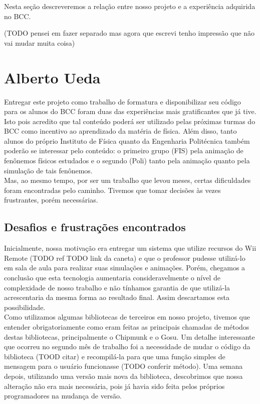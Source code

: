 Nesta seção descreveremos a relação entre nosso projeto e a experiência adquirida no BCC.

(TODO pensei em fazer separado mas agora que escrevi tenho impressão que não vai mudar muita coisa)

\section{Alberto Ueda}
Entregar este projeto como trabalho de formatura e disponibilizar seu código para os alunos do BCC foram duas das experiências mais gratificantes que já tive. Isto pois acredito que tal conteúdo poderá ser utilizado pelas próximas turmas do BCC como incentivo ao aprendizado da matéria de física. Além disso, tanto alunos do próprio Instituto de Física quanto da Engenharia Politécnica também poderão se interessar pelo conteúdo: o primeiro grupo (FIS) pela animação de fenônemos físicos estudados e o segundo (Poli) tanto pela animação quanto pela simulação de tais fenônemos. \\

Mas, ao mesmo tempo, por ser um trabalho que levou meses, certas dificuldades foram encontradas pelo caminho. Tivemos que tomar decisões às vezes frustrantes, porém necessárias.\\

\subsection{Desafios e frustrações encontrados}
Inicialmente, nossa motivação era entregar um sistema que utilize recursos do Wii Remote (TODO ref TODO link da caneta) e que o professor pudesse utilizá-lo em sala de aula para realizar suas simulações e animações. Porém, chegamos a conclusão que esta tecnologia aumentaria consideravelmente o nível de complexidade de nosso trabalho e não tínhamos garantia de que utilizá-la acrescentaria da mesma forma ao resultado final. Assim descartamos esta possibilidade.\\

Como utilizamos algumas bibliotecas de terceiros em nosso projeto, tivemos que entender obrigatoriamente como eram feitas as principais chamadas de métodos destas bibliotecas, principalmente o Chipmunk e o Gosu. Um detalhe interessante que ocorreu no segundo mês de trabalho foi a necessidade de mudar o código da biblioteca (TOOD citar) e recompilá-la para que uma função simples de mensagem para o usuário funcionasse (TODO conferir método). Uma semana depois, utilizando uma versão mais nova da biblioteca, descobrimos que nossa alteração não era mais necessária, pois já havia sido feita pelos próprios programadores na mudança de versão.\\

